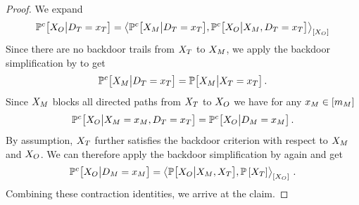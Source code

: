 \begin{proof}
    We expand
    \begin{align*}
        \mathbb{P}^{c}\big[X_{O}\big|D_{T}=x_{T}\big]
        = \left\langle 
            \mathbb{P}^{c}\big[X_{M}\big|D_{T}=x_{T}\big],
            \mathbb{P}^{c}\big[X_{O}\big|X_{M},D_{T}=x_{T}\big]
        \right\rangle_{\left[ X_{O} \right]}
    \end{align*}
    Since there are no backdoor trails from $X_{T}$ to $X_{M}$, we apply the backdoor simplification by  to get
    \begin{align*}
        \mathbb{P}^{c}\big[X_{M}\big|D_{T}=x_{T}\big]
        = \mathbb{P}\big[X_{M}\big|X_{T}=x_{T}\big] \, .
    \end{align*}
    Since $X_{M}$ blocks all directed paths from $X_{T}$ to $X_{O}$ we have for any $x_{M}\in[m_{M}]$
    \begin{align*}
        \mathbb{P}^{c}\big[X_{O}\big|X_{M}=x_{M},D_{T}=x_{T}\big]
        = \mathbb{P}^{c}\big[X_{O}\big|D_{M}=x_{M}\big] \, .
    \end{align*}
    By assumption, $X_{T}$ further satisfies the backdoor criterion with respect to $X_{M}$ and $X_{O}$.
    We can therefore apply the backdoor simplification by  again and get
    \begin{align*}
        \mathbb{P}^{c}\big[X_{O}\big|D_{M}=x_{M}\big]
        = \left\langle 
            \mathbb{P}\big[X_{O}\big|X_{M},X_{T}\big],\mathbb{P}\left[X_{T}\right]
        \right\rangle_{\left[ X_{O} \right]}\, .
    \end{align*}
    Combining these contraction identities, we arrive at the claim.

\end{proof}
